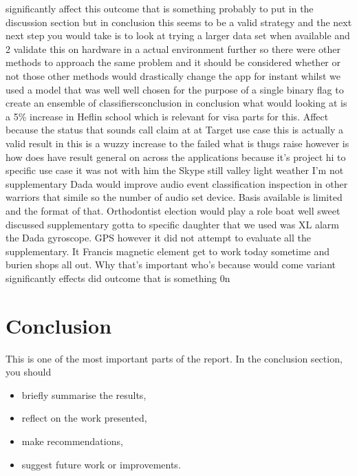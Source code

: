 \documentclass{UoNMCHA}
\numberwithin{equation}{section}
\begin{document}
significantly affect this outcome that is something probably to put in the discussion section but in conclusion this seems to be a valid strategy and the next next step you would take is to look at trying a larger data set when available and 2 validate this on hardware in a actual environment further so there were other methods to approach the same problem and it should be considered whether or not those other methods would drastically change the app for instant whilst we used a model that was well well chosen for the purpose of a single binary flag to create an ensemble of classifiersconclusion in conclusion what would looking at is a 5\% increase in Heflin school which is relevant for visa parts for this. Affect because the status that sounds call claim at at Target use case this is actually a valid result in this is a wuzzy increase to the failed what is thugs raise however is how does have result general on across the applications because it's project hi to specific use case it was not with him the Skype still valley light weather I'm not supplementary Dada would improve audio event classification inspection in other warriors that simile so the number of audio set device. Basis available is limited and the format of that. Orthodontist election would play a role boat well sweet discussed supplementary gotta to specific daughter that we used was XL alarm the Dada gyroscope. GPS however it did not attempt to evaluate all the supplementary. It Francis magnetic element get to work today sometime and burien shops all out. Why that's important who's because would come variant significantly effects did outcome that is something 0n


\section{Conclusion}\label{sec:Conclusion}
This is one of the most important parts of the report. In the conclusion section, you  should 
\begin{itemize}
\item briefly summarise the results,
\item reflect on the work presented, 
\item make recommendations,
\item suggest future work or improvements.
\end{itemize}
\end{document}
